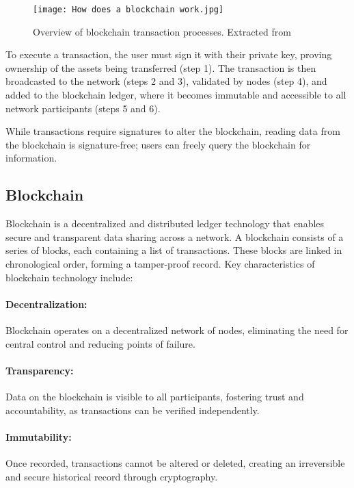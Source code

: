 \begin{figure}[H]
    \centering
    \texttt{[image: How does a blockchain work.jpg]}
    \caption[Blockchain transaction process]{Overview of blockchain transaction processes. Extracted from~\cite{how_blockchain_works}}\label{fig:how_does_a_blockchain_work}
\end{figure}

To execute a transaction, the user must sign it with their private key, proving
ownership of the assets being transferred (step 1). The transaction is then
broadcasted to the network (steps 2 and 3), validated by nodes (step 4), and
added to the blockchain ledger, where it becomes immutable and accessible to
all network participants (steps 5 and 6).

While transactions require signatures to alter the blockchain, reading data
from the blockchain is signature-free; users can freely query the blockchain
for information.

\subsection{Blockchain}\label{subsec:blockchain}

Blockchain is a decentralized and distributed ledger technology that enables
secure and transparent data sharing across a network. A blockchain consists of
a series of blocks, each containing a list of transactions. These blocks are
linked in chronological order, forming a tamper-proof record. Key
characteristics of blockchain technology include:

\paragraph{Decentralization:}
Blockchain operates on a decentralized network of nodes, eliminating the need
for central control and reducing points of failure.

\paragraph{Transparency:}
Data on the blockchain is visible to all participants, fostering trust and
accountability, as transactions can be verified independently.

\paragraph{Immutability:}
Once recorded, transactions cannot be altered or deleted, creating an
irreversible and secure historical record through cryptography.

